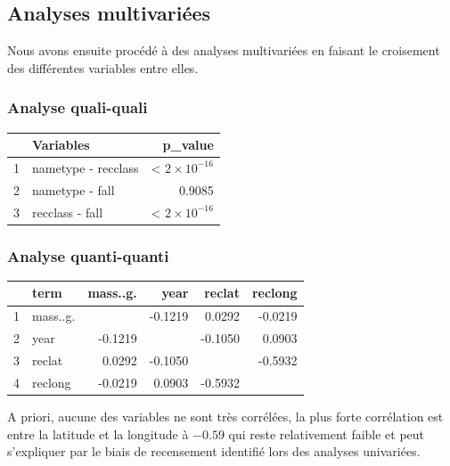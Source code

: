 \documentclass[12pt]{article}
\begin{document}
\subsection{Analyses multivariées}
Nous avons ensuite procédé à des analyses multivariées en faisant le croisement des différentes variables entre elles.
\subsubsection*{Analyse quali-quali}
\begin{table}[H]
\centering
\begin{tabular}{rlr}
  \hline
 & Variables & p\_value \\ 
  \hline
1 & nametype - recclass & < $2\times 10^{-16}$  \\ 
  2 & nametype - fall & 0.9085 \\ 
  3 & recclass - fall & < $2\times 10^{-16}$  \\ 
   \hline
\end{tabular}
\end{table}
\subsubsection*{Analyse quanti-quanti}
\begin{table}[H]
\centering
\begin{tabular}{rlrrrr}
  \hline
 & term & mass..g. & year & reclat & reclong \\ 
  \hline
1 & mass..g. &  & -0.1219 & 0.0292 & -0.0219 \\ 
  2 & year & -0.1219 &  & -0.1050 & 0.0903 \\ 
  3 & reclat & 0.0292 & -0.1050 &  & -0.5932 \\ 
  4 & reclong & -0.0219 & 0.0903 & -0.5932 &  \\ 
   \hline
\end{tabular}
\end{table}
A priori, aucune des variables ne sont très corrélées, la plus forte corrélation est entre la latitude et la longitude à $-0.59$ qui reste relativement faible et peut s'expliquer par le biais de recensement identifié lors des analyses univariées.
\end{document}

